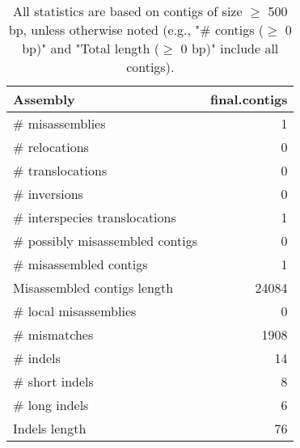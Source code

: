 \documentclass[12pt,a4paper]{article}
\begin{document}
\begin{table}[ht]
\begin{center}
\caption{All statistics are based on contigs of size $\geq$ 500 bp, unless otherwise noted (e.g., "\# contigs ($\geq$ 0 bp)" and "Total length ($\geq$ 0 bp)" include all contigs).}
\begin{tabular}{|l*{1}{|r}|}
\hline
Assembly & final.contigs \\ \hline
\# misassemblies & 1 \\ \hline
\hspace{5mm}\# relocations & 0 \\ \hline
\hspace{5mm}\# translocations & 0 \\ \hline
\hspace{5mm}\# inversions & 0 \\ \hline
\hspace{5mm}\# interspecies translocations & 1 \\ \hline
\# possibly misassembled contigs & 0 \\ \hline
\# misassembled contigs & 1 \\ \hline
Misassembled contigs length & 24084 \\ \hline
\# local misassemblies & 0 \\ \hline
\# mismatches & 1908 \\ \hline
\# indels & 14 \\ \hline
\hspace{5mm}\# short indels & 8 \\ \hline
\hspace{5mm}\# long indels & 6 \\ \hline
Indels length & 76 \\ \hline
\end{tabular}
\end{center}
\end{table}
\end{document}
